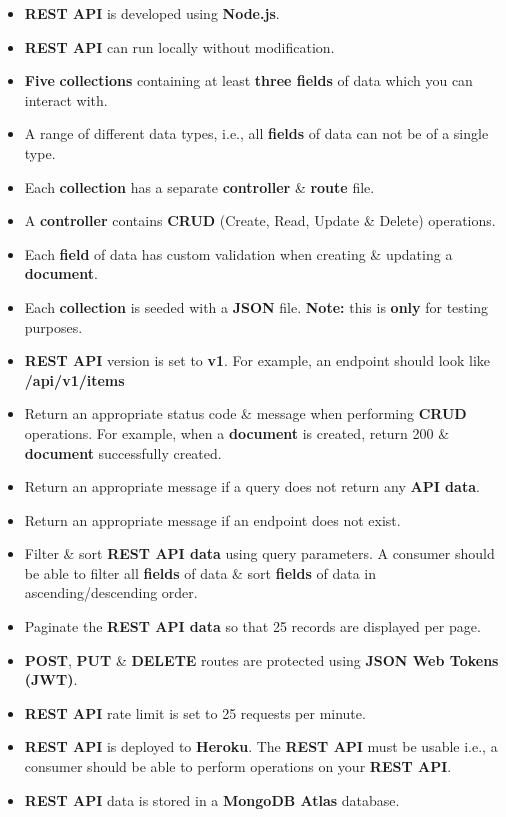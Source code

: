 \documentclass{article}
\begin{document}
\begin{itemize}
  \item \textbf{REST API} is developed using \textbf{Node.js}.
  \item \textbf{REST API} can run locally without modification.
  \item \textbf{Five} \textbf{collections} containing at least \textbf{three fields} of data which you can interact with.
  \item A range of different data types, i.e., all \textbf{fields} of data can not be of a single type.
  \item Each \textbf{collection} has a separate \textbf{controller} \& \textbf{route} file.
  \item A \textbf{controller} contains \textbf{CRUD} (Create, Read, Update \& Delete) operations.
  \item Each \textbf{field} of data has custom validation when creating \& updating a \textbf{document}.
  \item Each \textbf{collection} is seeded with a \textbf{JSON} file. \textbf{Note:} this is \textbf{only} for testing purposes.
  \item \textbf{REST API} version is set to \textbf{v1}. For example, an endpoint should look like \textbf{/api/v1/items}
  \item Return an appropriate status code \& message when performing \textbf{CRUD} operations. For example, when a \textbf{document} is created, return 200 \& \textbf{document} successfully created.
  \item Return an appropriate message if a query does not return any \textbf{API data}.
  \item Return an appropriate message if an endpoint does not exist.
  \item Filter \& sort \textbf{REST API data} using query parameters. A consumer should be able to filter all \textbf{fields} of data \& sort \textbf{fields} of data in ascending/descending order.
  \item Paginate the \textbf{REST API data} so that 25 records are displayed per page.
  \item \textbf{POST}, \textbf{PUT} \& \textbf{DELETE} routes are protected using \textbf{JSON Web Tokens (JWT)}.
  \item \textbf{REST API} rate limit is set to 25 requests per minute.
  \item \textbf{REST API} is deployed to \textbf{Heroku}. The \textbf{REST API} must be usable i.e., a consumer should be able to perform operations on your \textbf{REST API}.
  \item \textbf{REST API} data is stored in a \textbf{MongoDB Atlas} database.
\end{itemize}
\end{document}

